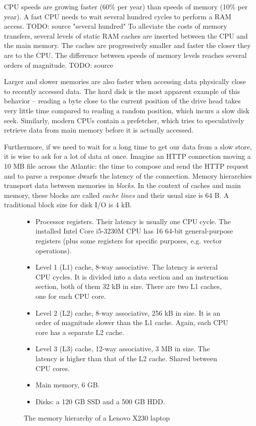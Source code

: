 CPU speeds are growing faster (60\% per year) than speeds of memory (10\% per
year)\cite{ailamaki05}. A fast CPU needs to wait several hundred cycles
to perform a RAM access. TODO: source "several hundred"
To alleviate the costs of memory transfers, several levels of static RAM
caches are inserted between the CPU and the main memory. The caches are
progressively smaller and faster the closer they are to the CPU. The difference
between speeds of memory levels reaches several orders of magnitude. TODO: source

Larger and slower memories are also faster when accessing data physically
close to recently accessed data. The hard disk is the most apparent example
of this behavior -- reading a byte close to the current position of the drive
head takes very little time compared to reading a random position, which incurs
a slow disk seek. %
Similarly, modern CPUs contain a prefetcher, which tries to speculatively
retrieve data from main memory before it is actually accessed.

Furthermore, if we need to wait for a long time to get our data from a slow
store, it is wise to ask for a lot of data at once. Imagine an HTTP connection
moving a 10 MB file across the Atlantic: the time to compose and send the HTTP
request and to parse a response dwarfs the latency of the connection.
Memory hierarchies transport data between memories in \textit{blocks}.
In the context of caches and main memory, these blocks are called
\textit{cache lines} and their usual size is 64 B.
A traditional block size for disk I/O is 4 kB.

\begin{figure}
\begin{itemize}
\item Processor registers. Their latency is usually one CPU cycle.
	The installed Intel Core i5-3230M CPU has 16 64-bit general-purpose
	registers (plus some registers for specific purposes, e.g. vector
	operations).
\item Level 1 (L1) cache, 8-way associative. The latency is several CPU cycles.
	It is divided into a data section and an instruction section,
	both of them 32 kB in size. There are two L1 caches, one for each CPU
	core.
\item Level 2 (L2) cache, 8-way associative, 256 kB in size.
	It is an order of magnitude slower than the L1 cache. Again, each
	CPU core has a separate L2 cache.
\item Level 3 (L3) cache, 12-way associative, 3 MB in size.
	The latency is higher than that of the L2 cache. Shared between CPU
	cores.
\item Main memory, 6 GB.
\item Disks: a 120 GB SSD and a 500 GB HDD.
\end{itemize}
\caption{The memory hierarchy of a Lenovo X230 laptop}
\end{figure}

